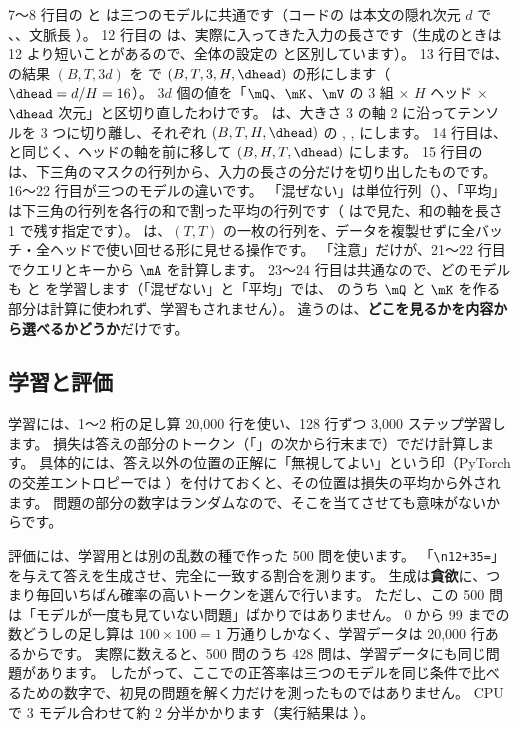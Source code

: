 7〜8 行目の  と  は三つのモデルに共通です（コードの  は本文の隠れ次元 $d$ で 、、文脈長 ）。
12 行目の  は、実際に入ってきた入力の長さです（生成のときは 12 より短いことがあるので、全体の設定の  と区別しています）。
13 行目では、 の結果 $(B,T,3d)$ を  で $(B,T,3,H,\dhead)$ の形にします（$\dhead=d/H=16$）。
$3d$ 個の値を「$\mQ$、$\mK$、$\mV$ の 3 組 × $H$ ヘッド × $\dhead$ 次元」と区切り直したわけです。
 は、大きさ 3 の軸 2 に沿ってテンソルを 3 つに切り離し、それぞれ $(B,T,H,\dhead)$ の , ,  にします。
14 行目は、と同じく、ヘッドの軸を前に移して $(B,H,T,\dhead)$ にします。
15 行目の  は、下三角のマスクの行列から、入力の長さの分だけを切り出したものです。
16〜22 行目が三つのモデルの違いです。
「混ぜない」は単位行列（）、「平均」は下三角の行列を各行の和で割った平均の行列です（ はで見た、和の軸を長さ 1 で残す指定です）。
 は、$(T,T)$ の一枚の行列を、データを複製せずに全バッチ・全ヘッドで使い回せる形に見せる操作です。
「注意」だけが、21〜22 行目でクエリとキーから $\mA$ を計算します。
23〜24 行目は共通なので、どのモデルも  と  を学習します（「混ぜない」と「平均」では、 のうち $\mQ$ と $\mK$ を作る部分は計算に使われず、学習もされません）。
違うのは、\textbf{どこを見るかを内容から選べるかどうか}だけです。

\subsection*{学習と評価}

学習には、1〜2 桁の足し算 20,000 行を使い、128 行ずつ 3,000 ステップ学習します。
損失は答えの部分のトークン（「\code{=}」の次から行末まで）でだけ計算します。
具体的には、答え以外の位置の正解に「無視してよい」という印（PyTorch の交差エントロピーでは ）を付けておくと、その位置は損失の平均から外されます。
問題の部分の数字はランダムなので、そこを当てさせても意味がないからです。

評価には、学習用とは別の乱数の種で作った 500 問を使います。
「\texttt{\textbackslash n12+35=}」を与えて答えを生成させ、完全に一致する割合を測ります。
生成は\textbf{貪欲}に、つまり毎回いちばん確率の高いトークンを選んで行います。
ただし、この 500 問は「モデルが一度も見ていない問題」ばかりではありません。
0 から 99 までの数どうしの足し算は $100\times100=1$ 万通りしかなく、学習データは 20,000 行あるからです。
実際に数えると、500 問のうち 428 問は、学習データにも同じ問題があります。
したがって、ここでの正答率は三つのモデルを同じ条件で比べるための数字で、初見の問題を解く力だけを測ったものではありません。
CPU で 3 モデル合わせて約 2 分半かかります（実行結果は ）。

